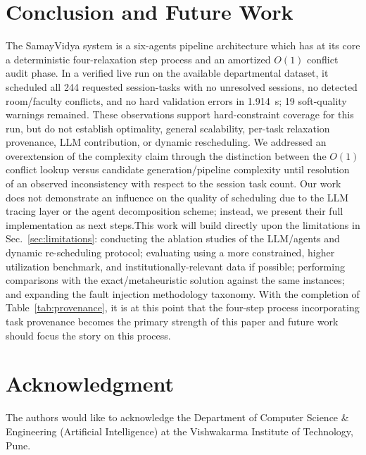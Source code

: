 \documentclass[conference]{IEEEtran}
\begin{document}
\section{Conclusion and Future Work}
The SamayVidya system is a six-agents pipeline architecture which has at its core a deterministic four-relaxation step process and an amortized $O(1)$ conflict audit phase. In a verified live run on the available departmental dataset, it scheduled all 244 requested session-tasks with no unresolved sessions, no detected room/faculty conflicts, and no hard validation errors in 1.914~s; 19 soft-quality warnings remained. These observations support hard-constraint coverage for this run, but do not establish optimality, general scalability, per-task relaxation provenance, LLM contribution, or dynamic rescheduling. We addressed an overextension of the complexity claim through the distinction between the $O(1)$ conflict lookup versus candidate generation/pipeline complexity until resolution of an observed inconsistency with respect to the session task count. Our work does not demonstrate an influence on the quality of scheduling due to the LLM tracing layer or the agent decomposition scheme; instead, we present their full implementation as next steps.This work will build directly upon the limitations in Sec.~\ref{sec:limitations}: conducting the ablation studies of the LLM/agents and dynamic re-scheduling protocol; evaluating using a more constrained, higher utilization benchmark, and institutionally-relevant data if possible; performing comparisons with the exact/metaheuristic solution against the same instances; and expanding the fault injection methodology taxonomy. With the completion of Table~\ref{tab:provenance}, it is at this point that the four-step process incorporating task provenance becomes the primary strength of this paper and future work should focus the story on this process.
\section*{Acknowledgment}
The authors would like to acknowledge the Department of Computer Science \& Engineering (Artificial Intelligence) at the Vishwakarma Institute of Technology, Pune.
\end{document}
